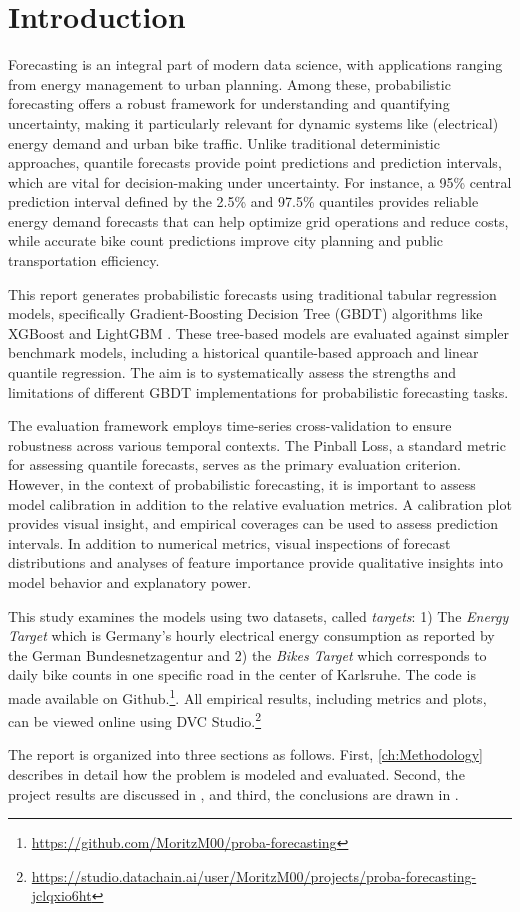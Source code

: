 \section{Introduction}
\label{ch:Introduction}


Forecasting is an integral part of modern data science, with applications ranging from energy management to urban planning. Among these, probabilistic forecasting offers a robust framework for understanding and quantifying uncertainty, making it particularly relevant for dynamic systems like (electrical) energy demand and urban bike traffic. Unlike traditional deterministic approaches, quantile forecasts provide point predictions and prediction intervals, which are vital for decision-making under uncertainty. For instance, a 95\% central prediction interval defined by the 2.5\% and 97.5\% quantiles provides reliable energy demand forecasts that can help optimize grid operations and reduce costs, while accurate bike count predictions improve city planning and public transportation efficiency.

This report generates probabilistic forecasts using traditional tabular regression models, specifically Gradient-Boosting Decision Tree (GBDT) algorithms like XGBoost \parencite{chen_xgboost_2016} and LightGBM \parencite{ke_lightgbm_2017}. These tree-based models are evaluated against simpler benchmark models, including a historical quantile-based approach and linear quantile regression. The aim is to systematically assess the strengths and limitations of different GBDT implementations for probabilistic forecasting tasks.

The evaluation framework employs time-series cross-validation to ensure robustness across various temporal contexts. The Pinball Loss, a standard metric for assessing quantile forecasts, serves as the primary evaluation criterion. However, in the context of probabilistic forecasting, it is important to assess model calibration in addition to the relative evaluation metrics. A calibration plot provides visual insight, and empirical coverages can be used to assess prediction intervals.
In addition to numerical metrics, visual inspections of forecast distributions and analyses of feature importance provide qualitative insights into model behavior and explanatory power.

This study examines the models using two datasets, called \textit{targets}: 1) The \textit{Energy Target} which is Germany's hourly electrical energy consumption \parencite{noauthor_smard_nodate} as reported by the German Bundesnetzagentur and 2) the \textit{Bikes Target} which corresponds to daily bike counts in one specific road in the center of Karlsruhe.
The code is made available on Github.\footnote{\href{https://github.com/MoritzM00/proba-forecasting}{https://github.com/MoritzM00/proba-forecasting}}. All empirical results, including metrics and plots, can be viewed online using DVC Studio.\footnote{\href{https://studio.datachain.ai/user/MoritzM00/projects/proba-forecasting-jclqxio6ht}{https://studio.datachain.ai/user/MoritzM00/projects/proba-forecasting-jclqxio6ht}}

The report is organized into three sections as follows. First, \cref{ch:Methodology} describes in detail how the problem is modeled and evaluated. Second, the project results are discussed in , and third, the conclusions are drawn in .